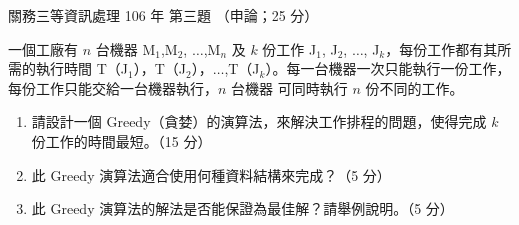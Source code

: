 \begin{pastexam}[label={px:gw3-106-ds-03}]{關務三等資訊處理 106 年 第三題}
（申論；25 分）

一個工廠有 $n$ 台機器 M$_1$,M$_2$, $\ldots$,M$_n$ 及 $k$ 份工作 J$_1$, J$_2$, $\ldots$, J$_k$，每份工作都有其所需的執行時間
T（J$_1$），T（J$_2$），$\ldots$,T（J$_k$）。每一台機器一次只能執行一份工作，每份工作只能交給一台機器執行，$n$ 台機器
可同時執行 $n$ 份不同的工作。
\begin{enumerate}[leftmargin=2.6em, labelsep=0.4em]
\item[㈠] 請設計一個 Greedy（貪婪）的演算法，來解決工作排程的問題，使得完成 $k$ 份工作的時間最短。（15 分）
\item[㈡] 此 Greedy 演算法適合使用何種資料結構來完成？（5 分）
\item[㈢] 此 Greedy 演算法的解法是否能保證為最佳解？請舉例說明。（5 分）
\end{enumerate}
\end{pastexam}

